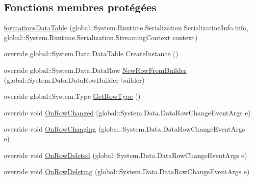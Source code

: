 \subsection*{Fonctions membres protégées}
\begin{DoxyCompactItemize}
\item 
\hyperlink{classforma_1_1formadb_data_set_1_1formations_data_table_a79cb9094da995a14ca2d086aa765c0b2}{formations\+Data\+Table} (global\+::\+System.\+Runtime.\+Serialization.\+Serialization\+Info info, global\+::\+System.\+Runtime.\+Serialization.\+Streaming\+Context context)
\item 
override global\+::\+System.\+Data.\+Data\+Table \hyperlink{classforma_1_1formadb_data_set_1_1formations_data_table_addd6eed85692bfb48db37b943461e04e}{Create\+Instance} ()
\item 
override global\+::\+System.\+Data.\+Data\+Row \hyperlink{classforma_1_1formadb_data_set_1_1formations_data_table_a43bcef181ff732da90cb8d93b0de16b5}{New\+Row\+From\+Builder} (global\+::\+System.\+Data.\+Data\+Row\+Builder builder)
\item 
override global\+::\+System.\+Type \hyperlink{classforma_1_1formadb_data_set_1_1formations_data_table_aa9ba73f1756d691eed5d162867322ab4}{Get\+Row\+Type} ()
\item 
override void \hyperlink{classforma_1_1formadb_data_set_1_1formations_data_table_a4523f2afa6b60c50af5fd421b4d3b961}{On\+Row\+Changed} (global\+::\+System.\+Data.\+Data\+Row\+Change\+Event\+Args e)
\item 
override void \hyperlink{classforma_1_1formadb_data_set_1_1formations_data_table_a344b55fbff38c6584db9a8560b33fa22}{On\+Row\+Changing} (global\+::\+System.\+Data.\+Data\+Row\+Change\+Event\+Args e)
\item 
override void \hyperlink{classforma_1_1formadb_data_set_1_1formations_data_table_a95c21d42190d2883c7803cee60e6987f}{On\+Row\+Deleted} (global\+::\+System.\+Data.\+Data\+Row\+Change\+Event\+Args e)
\item 
override void \hyperlink{classforma_1_1formadb_data_set_1_1formations_data_table_a1bab15f8b1ea039160d18c7a0e997447}{On\+Row\+Deleting} (global\+::\+System.\+Data.\+Data\+Row\+Change\+Event\+Args e)
\end{DoxyCompactItemize}
